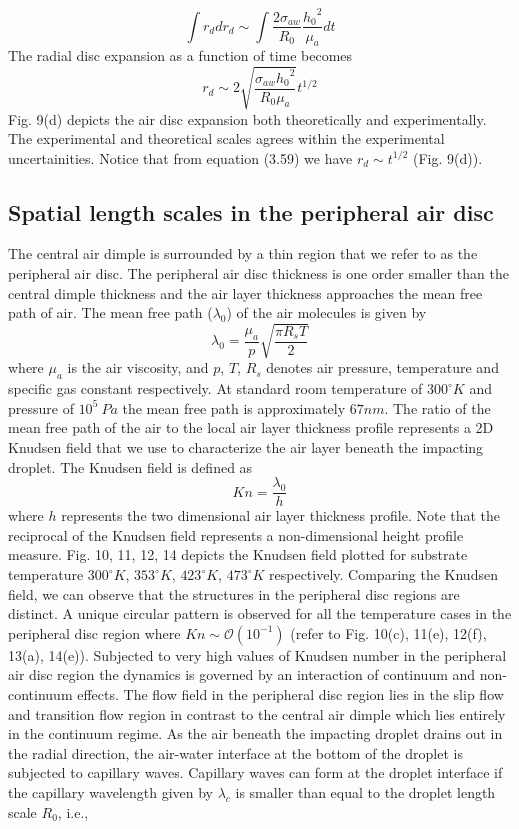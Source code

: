 \documentclass{jfm}
\begin{document}
\begin{equation}
    \int{r_ddr_d}{\sim}\int\frac{2{\sigma}_{aw}}{R_0}\frac{{h_0}^2}{{\mu}_a}dt
\end{equation}
The radial disc expansion as a function of time becomes
\begin{equation}
    r_d{\sim}2\sqrt{\frac{{\sigma}_{aw}{h_0}^2}{R_0{\mu}_a}}t^{1/2}
\end{equation}
Fig. 9(d) depicts the air disc expansion both theoretically and experimentally. The experimental and theoretical scales agrees within the experimental uncertainities. Notice that from equation (3.59) we have $r_d{\sim}t^{1/2}$ (Fig. 9(d)).
\subsection{Spatial length scales in the peripheral air disc}
The central air dimple is surrounded by a thin region that we refer to as the peripheral air disc. The peripheral air disc thickness is one order smaller than the central dimple thickness and the air layer thickness approaches the mean free path of air.
The mean free path (${\lambda}_0$) of the air molecules is given by 
\begin{equation}
    {\lambda}_0 = \frac{{\mu}_a}{p}\sqrt{\frac{{\pi}R_{s}T}{2}}
     \label{e10}
\end{equation}
where ${\mu}_a$ is the air viscosity, and $p$, $T$, $R_s$ denotes air pressure, temperature and specific gas constant respectively. At standard room temperature of $300^{\circ}K$ and pressure of $10^5{
\:}Pa$ the mean free path is approximately $67nm$. The ratio of the mean free path of the air to the local air layer thickness profile represents a 2D Knudsen field that we use to characterize the air layer beneath the impacting droplet. The Knudsen field is defined as
\begin{equation}
    Kn=\frac{{\lambda}_0}{h}
\end{equation}
where $h$ represents the two dimensional air layer thickness profile. Note that the reciprocal of the Knudsen field represents a non-dimensional height profile measure. 
Fig. 10, 11, 12, 14 depicts the Knudsen field plotted for substrate temperature $300^{\circ}K$, $353^{\circ}K$, $423^{\circ}K$, $473^{\circ}K$ respectively. Comparing the Knudsen field, we can observe that the structures in the peripheral disc regions are distinct. A unique circular pattern is observed for all the temperature cases in the peripheral disc region where $Kn{\sim}{\mathcal{O}(10^{-1})}$ (refer to Fig. 10(c), 11(e), 12(f), 13(a), 14(e)). Subjected to very high values of Knudsen number in the peripheral air disc region the dynamics is governed by an interaction of continuum and non-continuum effects. The flow field in the peripheral disc region lies in the slip flow and transition flow region in contrast to the central air dimple which lies entirely in the continuum regime. As the air beneath the impacting droplet drains out in the radial direction, the air-water interface at the bottom of the droplet is subjected to capillary waves. Capillary waves can form at the droplet interface if the capillary wavelength given by ${\lambda}_c$ is smaller than equal to the droplet length scale $R_0$, i.e.,
\end{document}
